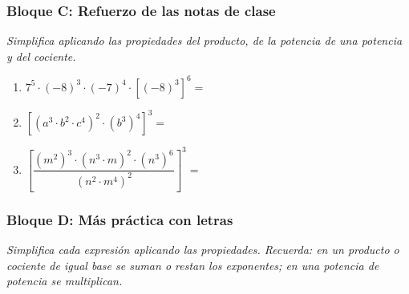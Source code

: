 \documentclass[12pt, letterpaper]{article}
\begin{document}
\subsubsection*{Bloque C: Refuerzo de las notas de clase}
\textit{Simplifica aplicando las propiedades del producto, de la potencia de una potencia y del cociente.}

\begin{enumerate}[leftmargin=*, start=132]
  \item \dificil{} $7^5 \cdot (-8)^3 \cdot (-7)^4 \cdot \left[(-8)^3\right]^6 =$

  \item \dificil{} $\left[(a^3 \cdot b^2 \cdot c^4)^2 \cdot (b^3)^4\right]^3 =$

  \item \muyDificil{} $\left[\dfrac{(m^2)^3 \cdot (n^3 \cdot m)^2 \cdot (n^3)^6}{(n^2 \cdot m^4)^2}\right]^3 =$
\end{enumerate}

\subsubsection*{Bloque D: Más práctica con letras}
\textit{Simplifica cada expresión aplicando las propiedades. Recuerda: en un producto o cociente de igual base se suman o restan los exponentes; en una potencia de potencia se multiplican.}
\end{document}
